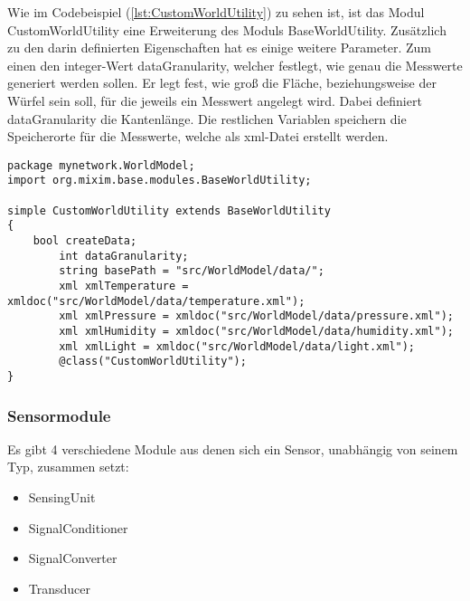 Wie im Codebeispiel (\ref{lst:CustomWorldUtility}) zu sehen ist, ist das Modul CustomWorldUtility eine Erweiterung des Moduls BaseWorldUtility. Zusätzlich zu den darin definierten Eigenschaften hat es einige weitere Parameter. Zum einen den integer-Wert dataGranularity, welcher festlegt, wie genau die Messwerte generiert werden sollen. Er legt fest, wie groß die Fläche, beziehungsweise  der Würfel sein soll, für die jeweils ein Messwert angelegt wird. Dabei definiert dataGranularity die Kantenlänge. Die restlichen Variablen speichern die Speicherorte für die Messwerte, welche als xml-Datei erstellt werden.

\begin{minipage}{\textwidth}
\begin{lstlisting}[language=ned,caption={CustomWorldUtility},label=lst:CustomWorldUtility]
package mynetwork.WorldModel;
import org.mixim.base.modules.BaseWorldUtility;

simple CustomWorldUtility extends BaseWorldUtility
{
    bool createData;
        int dataGranularity;
        string basePath = "src/WorldModel/data/";
        xml xmlTemperature = xmldoc("src/WorldModel/data/temperature.xml");
        xml xmlPressure = xmldoc("src/WorldModel/data/pressure.xml");
        xml xmlHumidity = xmldoc("src/WorldModel/data/humidity.xml");
        xml xmlLight = xmldoc("src/WorldModel/data/light.xml");
        @class("CustomWorldUtility");
}
\end{lstlisting}
\end{minipage}

\subsubsection{Sensormodule}

Es gibt 4 verschiedene Module aus denen sich ein Sensor, unabhängig von seinem Typ, zusammen setzt:

\begin{itemize}
\item SensingUnit
\item SignalConditioner
\item SignalConverter
\item Transducer
\end{itemize}

